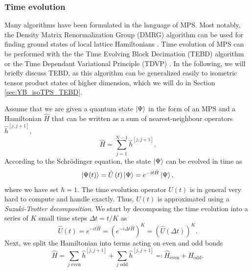 \subsubsection*{\hspace{162pt}Time evolution}
Many algorithms have been formulated in the language of MPS. Most notably, the Density Matrix Renormalization Group (DMRG) algorithm can be used for finding ground states of local lattice Hamiltonians \cite{cite:DMRG_in_the_age_of_MPS}. Time evolution of MPS can be performed with the the Time Evolving Block Decimation (TEBD) algorithm \cite{cite:efficient_simulation_of_1D_quantum_many_body_systems, cite:matrix_product_density_operators_simulation_of_finite_temperature_and_dissipative_systems} or the Time Dependant Variational Principle (TDVP) \cite{cite:time_dependent_variational_principle_for_quantum_lattices, cite:unifying_time_evolution_and_optimization_with_MPS}. In the following, we will briefly discuss TEBD, as this algorithm can be generalized easily to isometric tensor product states of higher dimension, which we will do in Section \ref{sec:YB_isoTPS_TEBD}. \par
Assume that we are given a quantum state $\ket{\Psi}$ in the form of an MPS and a Hamiltonian $\hat{H}$ that can be written as a sum of nearest-neighbour operators $\hat{h}^{[j,j+1]}$,
\begin{equation}
	\hat{H} = \sum_{j = 1}^{N-1} \hat{h}^{[j,j+1]}.
\end{equation}
According to the Schrödinger equation, the state $\ket{\Psi}$ can be evolved in time as
\begin{equation}
	\ket{\Psi(t)} = \hat{U}\left(t\right) \ket{\Psi} = e^{-it\hat{H}} \ket{\Psi},
\end{equation}
where we have set $\hbar = 1$. The time evolution operator $U(t)$ is in general very hard to compute and handle exactly. Thus, $U(t)$ is approximated using a \textit{Suzuki-Trotter decomposition}. We start by decomposing the time evolution into a series of $K$ small time steps $\Delta t = t/K$ as
\begin{equation}
	\hat{U}(t) = e^{-it\hat{H}} = \left(e^{-i\Delta t\hat{H}}\right)^K = \left(\hat{U}(\Delta t)\right)^K.
\end{equation}
Next, we split the Hamiltonian into terms acting on even and odd bonds
\begin{equation}
	\hat{H} = \sum_{j \text{ even}}\hat{h}^{[j, j+1]} + \sum_{j \text{ odd}}\hat{h}^{[j, j+1]} \eqqcolon \hat{H}_\text{even} + \hat{H}_\text{odd}.
\end{equation}
